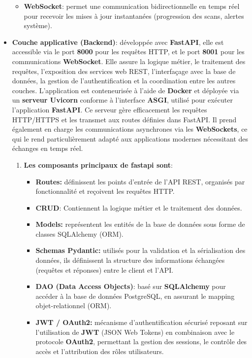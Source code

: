 \begin{itemize}[label=$-$]
\begin{itemize}[label=$\circ$]
            \item \textbf{WebSocket}: permet une communication bidirectionnelle en temps réel pour recevoir les mises à jour instantanées (progression des scans, alertes système).
        \end{itemize}
    \item \textbf{Couche applicative (Backend)}: développée avec \textbf{FastAPI}, elle est accessible via le port \textbf{8000} pour les requêtes \acs{HTTP}, et le port \textbf{8001} pour les communications \textbf{WebSocket}. Elle assure la logique métier, le traitement des requêtes, l’exposition des services web REST, l’interfaçage avec la base de données, la gestion de l’authentification et la coordination entre les autres couches.
    L’application est conteneurisée à l’aide de \textbf{Docker} et déployée via un \textbf{serveur Uvicorn} conforme à l’interface \textbf{\acs{ASGI}}, utilisé pour exécuter l’application \textbf{FastAPI}. Ce serveur gère efficacement les requêtes \acs{HTTP}/\acs{HTTPS} et les transmet aux routes définies dans FastAPI. Il prend également en charge les communications asynchrones via les \textbf{WebSockets}, ce qui le rend particulièrement adapté aux applications modernes nécessitant des échanges en temps réel.
    \begin{enumerate}[left=-0.03cm]
        \item \textbf{Les composants principaux de fastapi sont\cite{fastapiArc}}:
            \begin{itemize}[label=$\bullet$, left=-0.08cm]
                \item \textbf{Routes:} définissent les points d'entrée de l'\acs{API} REST, organisés par fonctionnalité et reçoivent les requêtes \acs{HTTP}.
                \item \textbf{CRUD}: Contiennent la logique métier et le traitement des données.
                \item \textbf{Models:} représentent les entités de la base de données sous forme de classes SQLAlchemy (\acs{ORM}).
                \item \textbf{Schemas Pydantic:} utilisés pour la validation et la sérialisation des données, ils définissent la structure des informations échangées (requêtes et réponses) entre le client et l’API.
                \item \textbf{\acs{DAO} (Data Access Objects)}: basé sur \textbf{SQLAlchemy} pour accéder à la base de données PostgreSQL, en assurant le mapping objet-relationnel (ORM).
                \item \textbf{JWT / OAuth2:} mécanisme d’authentification sécurisé reposant sur l’utilisation de \textbf{\acs{JWT}} (JSON Web Tokens) en combinaison avec le protocole \textbf{\acs{OAuth2}}, permettant la gestion des sessions, le contrôle des accès et l’attribution des rôles utilisateurs.

\end{itemize}
\end{enumerate}
\end{itemize}
